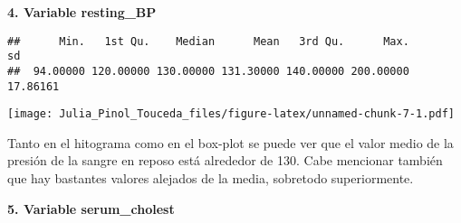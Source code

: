 \documentclass[]{article}
\newenvironment{Shaded}{\begin{snugshade}}{\end{snugshade}}
\newcommand{\KeywordTok}[1]{\textcolor[rgb]{0.13,0.29,0.53}{\textbf{#1}}}
\newcommand{\DataTypeTok}[1]{\textcolor[rgb]{0.13,0.29,0.53}{#1}}
\newcommand{\DecValTok}[1]{\textcolor[rgb]{0.00,0.00,0.81}{#1}}
\newcommand{\StringTok}[1]{\textcolor[rgb]{0.31,0.60,0.02}{#1}}
\newcommand{\OperatorTok}[1]{\textcolor[rgb]{0.81,0.36,0.00}{\textbf{#1}}}
\newcommand{\NormalTok}[1]{#1}
\begin{document}
\textbf{4. Variable resting\_BP}

\begin{Shaded}
\end{Shaded}

\begin{verbatim}
##      Min.   1st Qu.    Median      Mean   3rd Qu.      Max.        sd 
##  94.00000 120.00000 130.00000 131.30000 140.00000 200.00000  17.86161
\end{verbatim}

\begin{Shaded}
\end{Shaded}

\texttt{[image: Julia\_Pinol\_Touceda\_files/figure-latex/unnamed-chunk-7-1.pdf]}

Tanto en el hitograma como en el box-plot se puede ver que el valor
medio de la presión de la sangre en reposo está alrededor de 130. Cabe
mencionar también que hay bastantes valores alejados de la media,
sobretodo superiormente.

\textbf{5. Variable serum\_cholest}

\begin{Shaded}
\end{Shaded}
\end{document}
